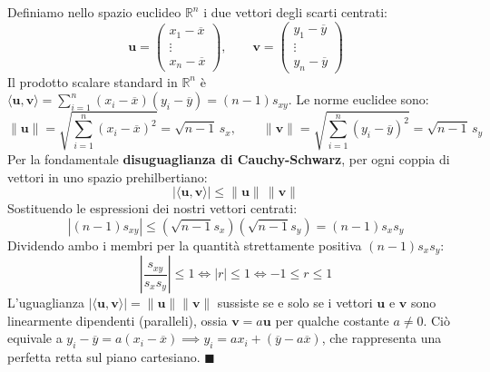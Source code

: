 \begin{dimostrazione}
Definiamo nello spazio euclideo $\mathbb{R}^n$ i due vettori degli scarti centrati:
\begin{equation}
\mathbf{u} = \begin{pmatrix} x_1 - \overline{x} \\ \vdots \\ x_n - \overline{x} \end{pmatrix}, \qquad
\mathbf{v} = \begin{pmatrix} y_1 - \overline{y} \\ \vdots \\ y_n - \overline{y} \end{pmatrix}
\end{equation}
Il prodotto scalare standard in $\mathbb{R}^n$ è $\langle \mathbf{u}, \mathbf{v} \rangle = \sum_{i=1}^n (x_i - \overline{x})(y_i - \overline{y}) = (n-1)s_{xy}$.
Le norme euclidee sono:
\begin{equation}
\|\mathbf{u}\| = \sqrt{\sum_{i=1}^n (x_i - \overline{x})^2} = \sqrt{n-1} \, s_x, \qquad \|\mathbf{v}\| = \sqrt{\sum_{i=1}^n (y_i - \overline{y})^2} = \sqrt{n-1} \, s_y
\end{equation}
Per la fondamentale \textbf{disuguaglianza di Cauchy-Schwarz}, per ogni coppia di vettori in uno spazio prehilbertiano:
\begin{equation}
|\langle \mathbf{u}, \mathbf{v} \rangle| \le \|\mathbf{u}\| \, \|\mathbf{v}\|
\end{equation}
Sostituendo le espressioni dei nostri vettori centrati:
\begin{equation}
|(n-1)s_{xy}| \le \left(\sqrt{n-1}s_x\right)\left(\sqrt{n-1}s_y\right) = (n-1)s_x s_y
\end{equation}
Dividendo ambo i membri per la quantità strettamente positiva $(n-1)s_x s_y$:
\begin{equation}
\left|\frac{s_{xy}}{s_x s_y}\right| \le 1 \iff |r| \le 1 \iff -1 \le r \le 1
\end{equation}
L'uguaglianza $|\langle \mathbf{u}, \mathbf{v} \rangle| = \|\mathbf{u}\|\|\mathbf{v}\|$ sussiste se e solo se i vettori $\mathbf{u}$ e $\mathbf{v}$ sono linearmente dipendenti (paralleli), ossia $\mathbf{v} = a \mathbf{u}$ per qualche costante $a \neq 0$. Ciò equivale a $y_i - \overline{y} = a(x_i - \overline{x}) \implies y_i = a x_i + (\overline{y} - a\overline{x})$, che rappresenta una perfetta retta sul piano cartesiano. $\blacksquare$
\end{dimostrazione}

